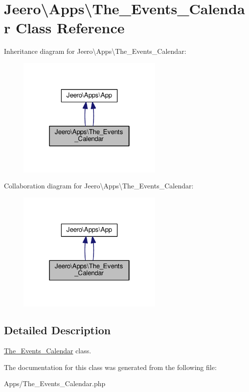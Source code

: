 \hypertarget{classJeero_1_1Apps_1_1The__Events__Calendar}{}\section{Jeero\textbackslash{}Apps\textbackslash{}The\+\_\+\+Events\+\_\+\+Calendar Class Reference}
\label{classJeero_1_1Apps_1_1The__Events__Calendar}


Inheritance diagram for Jeero\textbackslash{}Apps\textbackslash{}The\+\_\+\+Events\+\_\+\+Calendar\+:\nopagebreak
\begin{figure}[H]
\begin{center}
\leavevmode
\includegraphics[width=202pt]{classJeero_1_1Apps_1_1The__Events__Calendar__inherit__graph}
\end{center}
\end{figure}


Collaboration diagram for Jeero\textbackslash{}Apps\textbackslash{}The\+\_\+\+Events\+\_\+\+Calendar\+:\nopagebreak
\begin{figure}[H]
\begin{center}
\leavevmode
\includegraphics[width=202pt]{classJeero_1_1Apps_1_1The__Events__Calendar__coll__graph}
\end{center}
\end{figure}


\subsection{Detailed Description}
\hyperlink{classJeero_1_1Apps_1_1The__Events__Calendar}{The\+\_\+\+Events\+\_\+\+Calendar} class. 

The documentation for this class was generated from the following file\+:\begin{DoxyCompactItemize}
\item 
Apps/The\+\_\+\+Events\+\_\+\+Calendar.\+php\end{DoxyCompactItemize}
